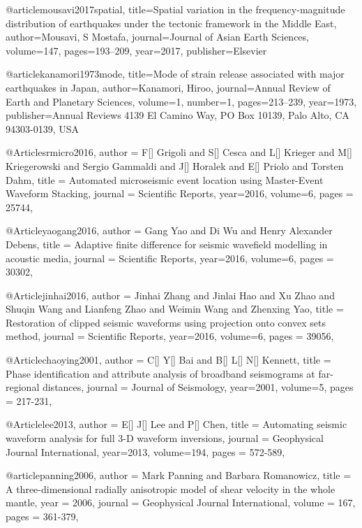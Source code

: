 @article{mousavi2017spatial,
  title={Spatial variation in the frequency-magnitude distribution of earthquakes under the tectonic framework in the Middle East},
  author={Mousavi, S Mostafa},
  journal={Journal of Asian Earth Sciences},
  volume={147},
  pages={193--209},
  year={2017},
  publisher={Elsevier}
}

@article{kanamori1973mode,
  title={Mode of strain release associated with major earthquakes in Japan},
  author={Kanamori, Hiroo},
  journal={Annual Review of Earth and Planetary Sciences},
  volume={1},
  number={1},
  pages={213--239},
  year={1973},
  publisher={Annual Reviews 4139 El Camino Way, PO Box 10139, Palo Alto, CA 94303-0139, USA}
}

@Article{srmicro2016,
  author =	 {F[] Grigoli and S[] Cesca and L[] Krieger and M[] Kriegerowski and Sergio Gammaldi and J[] Horalek and E[] Priolo and Torsten Dahm},
  title =	 {Automated microseismic event location using Master-Event Waveform Stacking},
  journal =	 {Scientific Reports},
  year=2016,
  volume=6,
  pages =	 {25744},
}

@Article{yaogang2016,
  author =	 {Gang Yao and Di Wu and Henry Alexander Debens},
  title =	 {Adaptive finite difference for seismic wavefield modelling in acoustic media},
  journal =	 {Scientific Reports},
  year=2016,
  volume=6,
  pages =	 {30302},
}

@Article{jinhai2016,
  author =	 {Jinhai Zhang and Jinlai Hao and Xu Zhao and Shuqin Wang and Lianfeng Zhao and Weimin Wang and Zhenxing Yao},
  title =	 {Restoration of clipped seismic waveforms using projection onto convex sets method},
  journal =	 {Scientific Reports},
  year=2016,
  volume=6,
  pages =	 {39056},
}

@Article{chaoying2001,
  author =	 {C[] Y[] Bai and B[] L[] N[] Kennett},
  title =	 {Phase identification and attribute analysis of broadband seismograms at far-regional distances},
  journal =	 {Journal of Seismology},
  year=2001,
  volume=5,
  pages =	 {217-231},
}



@Article{lee2013,
  author =	 {E[] J[] Lee and P[] Chen},
  title =	 {Automating seismic waveform analysis for full 3-{D} waveform inversions},
  journal =	 {Geophysical Journal International},
  year=2013,
  volume=194,
  pages =	 {572-589},
}

@article{panning2006,
author = {Mark Panning and Barbara Romanowicz},
title = {A three-dimensional radially anisotropic model of shear velocity
in the whole mantle},
year = {2006},
journal = {Geophysical Journal International},
volume = {167},
pages = {361-379},
}

